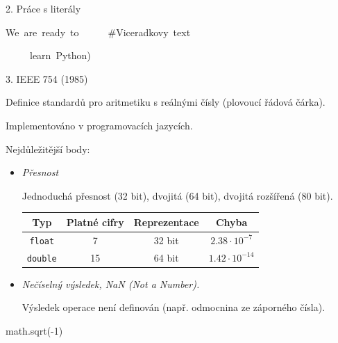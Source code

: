 \documentclass[czech]{beamer}
\providecommand{\tabularnewline}{\\}
\newenvironment{lyxcode}
  {\par\begin{list}{}{
    \setlength{\rightmargin}{\leftmargin}
    \setlength{\listparindent}{0pt}%
    \raggedright
    \setlength{\itemsep}{0pt}
    \setlength{\parsep}{0pt}
    \normalfont\ttfamily}%
   \def\{{\char`\{}
   \def\}{\char`\}}
   \def\textasciitilde{\char`\~}
   \item[]}
  {\end{list}}
\begin{document}
\begin{frame}[plain]{2. Práce s literály}
\begin{lyxcode}
{\scriptsize\textquotedbl\textquotedbl\textquotedbl We~are~ready~to~~~~~~\#Viceradkovy~text}{\scriptsize\par}

{\scriptsize ~~~~~learn~\textquotedbl Python\textquotedbl\textquotedbl\textquotedbl )}{\scriptsize\par}
\end{lyxcode}
\end{frame}

\begin{frame}[plain]{3. IEEE 754 (1985)}

{\tiny Definice standardů pro aritmetiku s reálnými čísly (plovoucí
řádová čárka).}{\tiny\par}

{\tiny Implementováno v programovacích jazycích.}{\tiny\par}

{\tiny\medskip{}
}{\tiny\par}

{\tiny Nejdůležitější body:}{\tiny\par}
\begin{itemize}
\item {\tiny\emph{Přesnost}}{\tiny\par}

{\tiny Jednoduchá přesnost (32 bit), dvojitá (64 bit), dvojitá rozšířená
(80 bit).}{\tiny\par}
\begin{center}
{\tiny{}%
\begin{tabular}{|c|c|c|c|}
\hline 
{\tiny Typ} & {\tiny Platné cifry} & {\tiny Reprezentace} & {\tiny Chyba}\tabularnewline
\hline 
\hline 
{\tiny\texttt{float}} & {\tiny 7} & {\tiny 32 bit} & {\tiny$2.38\cdot10^{-7}$}\tabularnewline
\hline 
{\tiny\texttt{double}} & {\tiny 15} & {\tiny 64 bit} & {\tiny$1.42\cdot10^{-14}$}\tabularnewline
\hline 
\end{tabular}}{\tiny\par}
\par\end{center}
\item {\tiny\emph{Nečíselný výsledek, NaN (Not a Number).}}{\tiny\par}

{\tiny Výsledek operace není definován (např. odmocnina ze záporného
čísla).}{\tiny\par}

\end{itemize}
\begin{lyxcode}
{\tiny math.sqrt(-1)~}{\tiny\par}


\end{lyxcode}
\end{frame}
\end{document}
